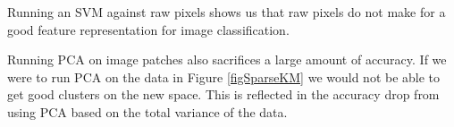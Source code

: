 \documentclass[a0paper,landscape,final]{baposter}
\begin{document}
\begin{poster}
{Running an SVM against raw pixels shows us that raw pixels do not make for a good feature representation for image classification.

Running PCA on image patches also sacrifices a large amount of accuracy. If we were to run PCA on the data in Figure \ref{figSparseKM} we would not be able to get good clusters on the new space. This is reflected in the accuracy drop from using PCA based on the total variance of the data.




}
\end{poster}
\end{document}
